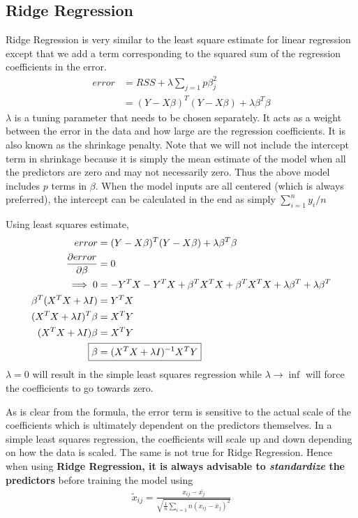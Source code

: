 \documentclass[../statistical_learning_notes.tex]{subfiles}
\begin{document}
    \subsection{Ridge Regression}
    Ridge Regression is very similar to the least square estimate for linear regression except that we add a term corresponding to the squared sum of the regression coefficients in the error.
    \begin{align*}
        error &= RSS + \lambda \sum_{j=1}{p}\beta_{j}^{2}\\
              &= (Y-X\beta)^{T}(Y-X\beta) + \lambda \beta^{T}\beta
    \end{align*}
    $\lambda$ is a tuning parameter that needs to be chosen separately. It acts as a weight between the error in the data and how large are the regression coefficients. It is also known as the shrinkage penalty.\newline
    Note that we will not include the intercept term in shrinkage because it is simply the mean estimate of the model when all the predictors are zero and may not necessarily zero. Thus the above model includes $p$ terms in $\beta$. When the model inputs are all centered (which is always preferred), the intercept can be calculated in the end as simply $\sum_{i=1}^{n}y_{i}/n$\newline

    Using least squares estimate,
    \begin{align*}
        error &= (Y-X\beta)^{T}(Y-X\beta) + \lambda \beta^{T}\beta\\
        \frac{\partial error}{\partial \beta} &= 0\\
        \implies 0 &= -Y^{T}X - Y^{T}X + \beta^{T}X^{T}X + \beta^{T}X^{T}X + \lambda \beta^{T} + \lambda \beta^{T}\\
        \beta^{T}(X^{T}X + \lambda I) &= Y^{T}X\\
        (X^{T}X + \lambda I)^{T}\beta &= X^{T}Y\\
        (X^{T}X + \lambda I)\beta &= X^{T}Y\\
        \Aboxed{\beta &= (X^{T}X + \lambda I)^{-1}X^{T}Y}  
    \end{align*}
    $\lambda = 0$ will result in the simple least squares regression while $\lambda \to \inf$ will force the coefficients to go towards zero.\newline

    As is clear from the formula, the error term is sensitive to the actual scale of the coefficients which is ultimately dependent on the predictors themselves. In a simple least squares regression, the coefficients will scale up and down depending on how the data is scaled. The same is not true for Ridge Regression.\newline
    Hence when using \textbf{Ridge Regression, it is always advisable to \emph{standardize} the predictors} before training the model using
    \begin{align*}
        \tilde{x}_{ij} = \frac{x_{ij} - \bar{x_{j}}}{\sqrt{\frac{1}{n}\sum_{i=1}{n}(x_{ij}-\bar{x}_{j})^{2}}}
    \end{align*}
\end{document}
